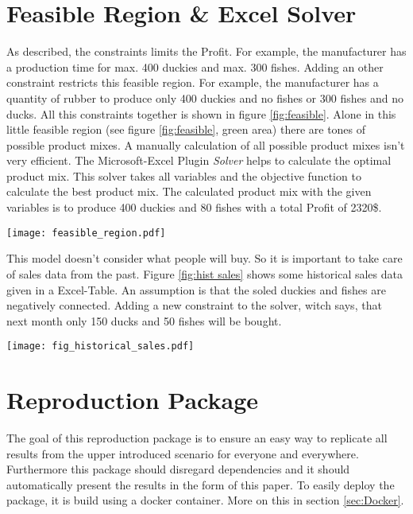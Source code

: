 \documentclass{article}
\begin{document}
\begin{multicols}{2}
\section{Feasible Region \& Excel Solver}
As described, the constraints limits the Profit. For example, the manufacturer has a production time for max. 400 duckies and max. 300 fishes. Adding an other constraint restricts this feasible region. For example, the manufacturer has a quantity of rubber to produce only 400 duckies and no fishes or 300 fishes and no ducks. All this constraints together is shown in figure \ref{fig:feasible}. Alone in this little feasible region (see figure \ref{fig:feasible}, green area) there are tones of possible product mixes. A manually calculation of all possible product mixes isn't very efficient. The Microsoft-Excel Plugin \textit{Solver} \cite{microsoft} helps to calculate the optimal product mix. This solver takes all variables and the objective function to calculate the best product mix. The calculated product mix with the given variables is to produce 400 duckies and 80 fishes with a total Profit of 2320\$.

\begin{center}
\texttt{[image: feasible\_region.pdf]}
\label{fig:feasible}
\end{center}

This model doesn't consider what people will buy. So it is important to take care of sales data from the past. Figure \ref{fig:hist sales} shows some historical sales data given in a Excel-Table. An assumption is that the soled duckies and fishes are negatively connected. Adding a new constraint to the solver, witch says, that next month only 150 ducks and 50 fishes will be bought.

\begin{center}
\texttt{[image: fig\_historical\_sales.pdf]}
\label{fig:hist sales}
\end{center}

\section{Reproduction Package}
The goal of this reproduction package is to ensure an easy way to replicate all results from the upper introduced scenario for everyone and everywhere. Furthermore this package should disregard dependencies and it should automatically present the results in the form of this paper. To easily deploy the package, it is build using a docker container. More on this in section \ref{sec:Docker}.



\end{multicols}
\end{document}
